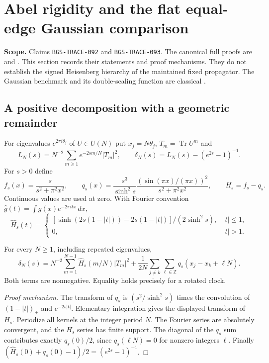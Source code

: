 \section{Abel rigidity and the flat equal-edge Gaussian comparison}
\label{sec:abel-gaussian-20261016}
\noindent\textbf{Scope.} Claims \texttt{BGS-TRACE-092} and
\texttt{BGS-TRACE-093}. The canonical full proofs are
 and
. This section records
their statements and proof mechanisms. They do not establish the signed
Heisenberg hierarchy of the maintained fixed propagator. The Gaussian
benchmark and its double-scaling function are classical
\cite{KPSS2002,ByunForrester2023}.

\subsection{A positive decomposition with a geometric remainder}
For eigenvalues $e^{2\pi i\theta_j}$ of $U\in U(N)$ put
$x_j=N\theta_j$, $T_m=\operatorname{Tr}U^m$ and
\[
 L_N(s)=N^{-2}\sum_{m\ge1}e^{-2sm/N}|T_m|^2,\qquad
 \delta_N(s)=L_N(s)-(e^{2s}-1)^{-1}.
\]
For $s>0$ define
\[
 f_s(x)=\frac{s}{s^2+\pi^2x^2},\qquad
 q_s(x)=\frac{s^3}{\sinh^2s}
      \frac{(\sin(\pi x)/(\pi x))^2}{s^2+\pi^2x^2},
 \qquad H_s=f_s-q_s.
\]
Continuous values are used at zero. With Fourier convention
$\widehat g(t)=\int g(x)e^{-2\pi itx}\,dx$,
\[
 \widehat H_s(t)=
 \begin{cases}
 [\sinh(2s(1-|t|))-2s(1-|t|)]/(2\sinh^2s),&|t|\le1,\\
 0,&|t|>1.
 \end{cases}
\]
\begin{theorem}
For every $N\ge1$, including repeated eigenvalues,
\begin{equation}
 \delta_N(s)=N^{-2}\sum_{m=1}^{N-1}\widehat H_s(m/N)|T_m|^2
   +\frac1{2N}\sum_{j\ne k}\sum_{\ell\in\mathbb Z}
                     q_s(x_j-x_k+\ell N).
 \label{eq:abel-positive-20261016}
\end{equation}
Both terms are nonnegative. Equality holds precisely for a rotated clock.
\end{theorem}
\begin{proof}[Proof mechanism]
The transform of $q_s$ is $(s^2/\sinh^2s)$ times the convolution of
$(1-|t|)_+$ and $e^{-2s|t|}$. Elementary integration gives the displayed
transform of $H_s$. Periodize all kernels at the integer period $N$.
The Fourier series are absolutely convergent, and the $H_s$ series has
finite support. The diagonal of the $q_s$ sum contributes exactly
$q_s(0)/2$, since $q_s(\ell N)=0$ for nonzero integers $\ell$.
Finally $(\widehat H_s(0)+q_s(0)-1)/2=(e^{2s}-1)^{-1}$.
\end{proof}

